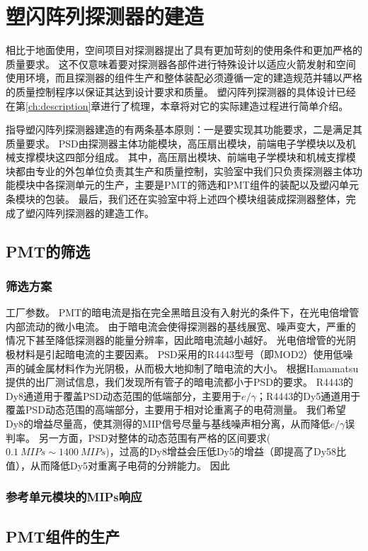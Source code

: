 \chapter{塑闪阵列探测器的建造}
\label{ch:construction}
相比于地面使用，空间项目对探测器提出了具有更加苛刻的使用条件和更加严格的质量要求。
这不仅意味着要对探测器各部件进行特殊设计以适应火箭发射和空间使用环境，而且探测器的组件生产和整体装配必须遵循一定的建造规范并辅以严格的质量控制程序以保证其达到设计要求和质量。
塑闪阵列探测器的具体设计已经在第\ref{ch:description}章进行了梳理，本章将对它的实际建造过程进行简单介绍。

指导塑闪阵列探测器建造的有两条基本原则：一是要实现其功能要求，二是满足其质量要求。
PSD由探测器主体功能模块，高压扇出模块，前端电子学模块以及机械支撑模块这四部分组成。
其中，高压扇出模块、前端电子学模块和机械支撑模块都由专业的外包单位负责其生产和质量控制，实验室中我们只负责探测器主体功能模块中各探测单元的生产，主要是PMT的筛选和PMT组件的装配以及塑闪单元条模块的包装。
最后，我们还在实验室中将上述四个模块组装成探测器整体，完成了塑闪阵列探测器的建造工作。

\section{PMT的筛选}
\subsection{筛选方案}
工厂参数。
PMT的暗电流是指在完全黑暗且没有入射光的条件下，在光电倍增管内部流动的微小电流。
由于暗电流会使得探测器的基线展宽、噪声变大，严重的情况下甚至降低探测器的能量分辨率，因此暗电流越小越好。
光电倍增管的光阴极材料是引起暗电流的主要因素。
PSD采用的R4443型号（即MOD2）使用低噪声的碱金属材料作为光阴极，从而极大地抑制了暗电流的大小。
根据Hamamatsu提供的出厂测试信息，我们发现所有管子的暗电流都小于PSD的要求。
R4443的Dy8通道用于覆盖PSD动态范围的低端部分，主要用于$e/\gamma$；R4443的Dy5通道用于覆盖PSD动态范围的高端部分，主要用于相对论重离子的电荷测量。
我们希望Dy8的增益尽量高，使其测得的MIP信号尽量与基线噪声相分离，从而降低$e/\gamma$误判率。
另一方面，PSD对整体的动态范围有严格的区间要求($\SI{0.1}{MIPs}\sim\SI{1400}{MIPs}$)，过高的Dy8增益会压低Dy5的增益（即提高了Dy58比值），从而降低Dy5对重离子电荷的分辨能力。
因此
\subsection{参考单元模块的MIPs响应}

\section{PMT组件的生产}
\label{sec:construction:pmt_assembly}
